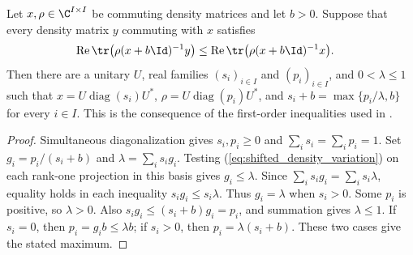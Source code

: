 \begin{theorem}
\label{thm:shifted_density_clipping}
\leanok
Let $x,\rho\in\C^{I\times I}$ be commuting density matrices and let $b>0$.
Suppose that every density matrix $y$ commuting with $x$ satisfies
\begin{align}
 \operatorname{Re}\tr\bigl(\rho(x+b\Id)^{-1}y\bigr)
 &\le \operatorname{Re}\tr\bigl(\rho(x+b\Id)^{-1}x\bigr).
 \label{eq:shifted_density_variation}
\end{align}
Then there are a unitary $U$, real families $(s_i)_{i\in I}$ and
$(p_i)_{i\in I}$, and $0<\lambda\le1$ such that
$x=U\operatorname{diag}(s_i)U^*$, $\rho=U\operatorname{diag}(p_i)U^*$, and
$s_i+b=\max\{p_i/\lambda,b\}$ for every $i\in I$.
This is the consequence of the first-order inequalities used in
\cite[Section~4, clipped eigenvalues]{OpenAI2026PolynomialPEPS}.
\end{theorem}
\begin{proof}
\leanok
Simultaneous diagonalization gives $s_i,p_i\ge0$ and
$\sum_i s_i=\sum_i p_i=1$. Set $g_i=p_i/(s_i+b)$ and
$\lambda=\sum_i s_i g_i$. Testing (\ref{eq:shifted_density_variation})
on each rank-one projection in this basis gives $g_i\le\lambda$.
Since $\sum_i s_i g_i=\sum_i s_i\lambda$, equality holds in each
inequality $s_i g_i\le s_i\lambda$. Thus $g_i=\lambda$ when $s_i>0$.
Some $p_i$ is positive, so $\lambda>0$. Also
$s_i g_i\le(s_i+b)g_i=p_i$, and summation gives $\lambda\le1$.
If $s_i=0$, then $p_i=g_i b\le\lambda b$; if $s_i>0$, then
$p_i=\lambda(s_i+b)$. These two cases give the stated maximum.
\end{proof}

